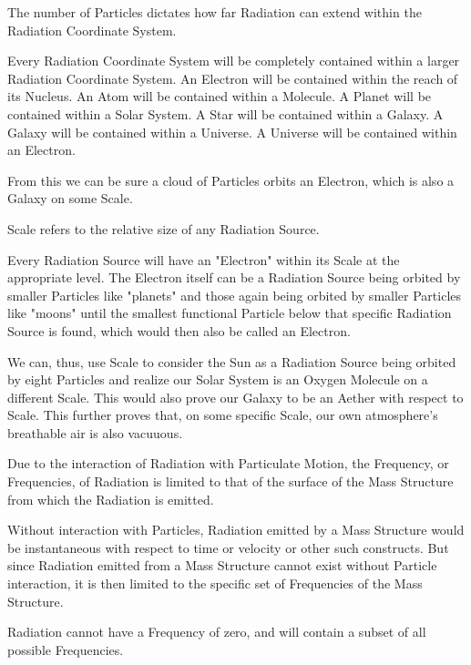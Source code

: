 \documentclass[12pt]{article}
\begin{document}
The number of Particles dictates how far Radiation can extend within the Radiation Coordinate System. 

Every Radiation Coordinate System will be completely contained within a larger Radiation Coordinate System. An Electron will be contained within the reach of its Nucleus. An Atom will be contained within a Molecule. A Planet will be contained within a Solar System. A Star will be contained within a Galaxy. A Galaxy will be contained within a Universe. A Universe will be contained within an Electron. 

From this we can be sure a cloud of Particles orbits an Electron, which is also a Galaxy on some Scale.

\begin{defn}
   Scale refers to the relative size of any Radiation Source.
\end{defn}

Every Radiation Source will have an "Electron" within its Scale at the appropriate level. The Electron itself can be a Radiation Source being orbited by smaller Particles like "planets" and those again being orbited by smaller Particles like "moons" until the smallest functional Particle below that specific Radiation Source is found, which would then also be called an Electron.

We can, thus, use Scale to consider the Sun as a Radiation Source being orbited by eight Particles and realize our Solar System is an Oxygen Molecule on a different Scale. This would also prove our Galaxy to be an Aether with respect to Scale. This further proves that, on some specific Scale, our own atmosphere's breathable air is also vacuuous.

\begin{thm}
   Due to the interaction of Radiation with Particulate Motion, the Frequency, or Frequencies, of Radiation is limited to that of the surface of the Mass Structure from which the Radiation is emitted.
\end{thm}

Without interaction with Particles, Radiation emitted by a Mass Structure would be instantaneous with respect to time or velocity or other such constructs. But since Radiation emitted from a Mass Structure cannot exist without Particle interaction, it is then limited to the specific set of Frequencies of the Mass Structure.

\begin{thm}
   Radiation cannot have a Frequency of zero, and will contain a subset of all possible Frequencies.
\end{thm}
\end{document}
